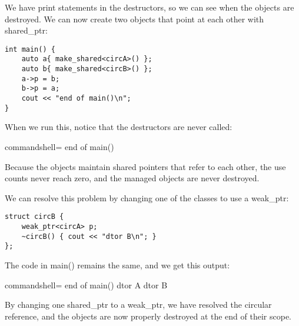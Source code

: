 We have print statements in the destructors, so we can see when the objects are destroyed. We can now create two objects that point at each other with shared\_ptr:

\begin{lstlisting}[style=styleCXX]
int main() {
	auto a{ make_shared<circA>() };
	auto b{ make_shared<circB>() };
	a->p = b;
	b->p = a;
	cout << "end of main()\n";
}
\end{lstlisting}

When we run this, notice that the destructors are never called:

\begin{tcblisting}{commandshell={}}
end of main()
\end{tcblisting}

Because the objects maintain shared pointers that refer to each other, the use counts never reach zero, and the managed objects are never destroyed.

We can resolve this problem by changing one of the classes to use a weak\_ptr:

\begin{lstlisting}[style=styleCXX]
struct circB {
	weak_ptr<circA> p;
	~circB() { cout << "dtor B\n"; }
};
\end{lstlisting}

The code in main() remains the same, and we get this output:

\begin{tcblisting}{commandshell={}}
end of main()
dtor A
dtor B
\end{tcblisting}

By changing one shared\_ptr to a weak\_ptr, we have resolved the circular reference, and the objects are now properly destroyed at the end of their scope.








